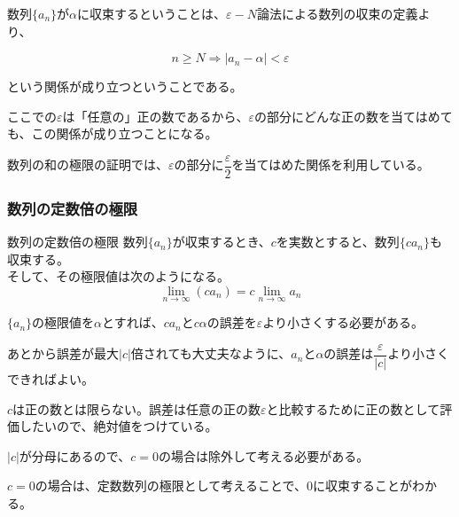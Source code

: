 \documentclass[../../imaging-math]{subfiles}
\begin{document}
数列$\{a_n\}$が$\alpha$に収束するということは、$\varepsilon-N$論法による数列の収束の定義より、

\begin{equation}
  n \geq N \Longrightarrow |a_n - \alpha| < \varepsilon
\end{equation}

という関係が成り立つということである。

ここでの$\varepsilon$は「任意の」正の数であるから、$\varepsilon$の部分にどんな正の数を当てはめても、この関係が成り立つことになる。

数列の和の極限の証明では、$\varepsilon$の部分に$\dfrac{\varepsilon}{2}$を当てはめた関係を利用している。

\subsubsection{数列の定数倍の極限}

\begin{theorem}{数列の定数倍の極限}
  \titlegap
  数列$\{a_n\}$が収束するとき、$c$を実数とすると、数列$\{ca_n\}$も収束する。\\
  そして、その極限値は次のようになる。
  \LARGE
  \begin{equation}
    \lim_{n \to \infty} (ca_n) = c\lim_{n \to \infty} a_n
  \end{equation}
\end{theorem}

$\{a_n\}$の極限値を$\alpha$とすれば、$ca_n$と$c\alpha$の誤差を$\varepsilon$より小さくする必要がある。

あとから誤差が最大$|c|$倍されても大丈夫なように、$a_n$と$\alpha$の誤差は$\dfrac{\varepsilon}{|c|}$より小さくできればよい。

\begin{supplnote}
  $c$は正の数とは限らない。誤差は任意の正の数$\varepsilon$と比較するために正の数として評価したいので、絶対値をつけている。
\end{supplnote}

$|c|$が分母にあるので、$c=0$の場合は除外して考える必要がある。

$c=0$の場合は、定数数列の極限として考えることで、$0$に収束することがわかる。
\end{document}
